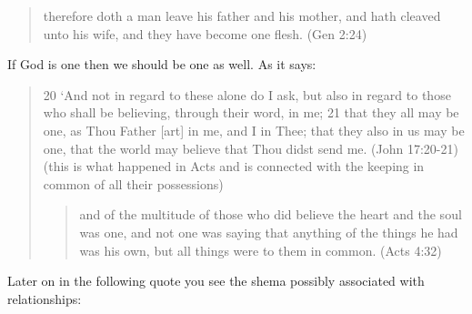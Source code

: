 \documentclass[11pt]{article}
\begin{document}
\begin{quote}
therefore doth a man leave his father and his mother, and hath cleaved unto his wife, and they have become one flesh. (Gen 2:24)
\end{quote}
If God is one then we should be one as well. As it says:\newline
\begin{quote}
20 `And not in regard to these alone do I ask, but also in regard to those who shall be believing, through their word, in me;
21 that they all may be one, as Thou Father [art] in me, and I in Thee; that they also in us may be one, that the world may believe that Thou didst send me. (John 17:20-21)
(this is what happened in Acts and is connected with the keeping in common of all their possessions)
\begin{quote}
and of the multitude of those who did believe the heart and the soul was one, and not one was saying that anything of the things he had was his own, but all things were to them in common. (Acts 4:32)
\end{quote}
\end{quote}
Later on in the following quote you see the shema possibly associated with relationships:
\end{document}
